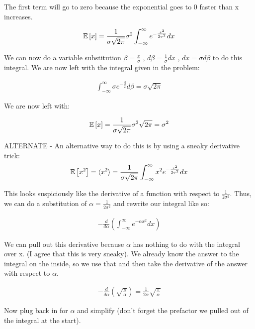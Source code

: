 \documentclass[11pt]{article}
\begin{document}
The first term will go to zero because the exponential goes to 0 faster than x increases.

\begin{eqnarray*}
\mathbb{E}\left[x\right] = \frac{1}{\sigma\sqrt{2\pi}} \sigma^2 \int_{-\infty}^{\infty} e^{-\frac{x^2}{2\sigma^2}} dx
\end{eqnarray*}

We can now do a variable substitution $\beta=\frac{x}{\sigma}$ , $d\beta=\frac{1}{\sigma}dx$ , $dx=\sigma d\beta$ to do this integral.  We are now left with the integral given in the problem:

\begin{eqnarray*}
\int_{-\infty}^{\infty} \sigma e^{-\frac{\beta}{2}} d\beta = \sigma \sqrt{2\pi}
\end{eqnarray*}

We are now left with:

\begin{eqnarray*}
\mathbb{E}\left[x\right] = \frac{1}{\sigma\sqrt{2\pi}} \sigma^3 \sqrt{2\pi} = \sigma^2
\end{eqnarray*}

ALTERNATE - An alternative way to do this is by using a sneaky derivative trick:
\begin{eqnarray*}
\mathbb{E}\left[x^2\right] = \langle x^2\rangle = \frac{1}{\sigma\sqrt{2\pi}} \int_{-\infty}^{\infty} x^2 e^{-\frac{x^2}{2\sigma^2}} dx 
\end{eqnarray*}

This looks suspiciously like the derivative of a function with respect to $\frac{1}{2\sigma^2}$.  Thus, we can do a substitution of $\alpha = \frac{1}{2\sigma^2}$ and rewrite our integral like so:

\begin{eqnarray*}
-\frac{d}{d\alpha} \left(\int_{-\infty}^{\infty} e^{-\alpha{x^2}} dx\right) 
\end{eqnarray*}

We can pull out this derivative because $\alpha$ has nothing to do with the integral over x.  (I agree that this is very sneaky).  We already know the answer to the integral on the inside, so we use that and then take the derivative of the answer with respect to $\alpha$.

\begin{eqnarray*}
-\frac{d}{d\alpha} \left(\sqrt{\frac{\pi}{\alpha}}\right) = \frac{1}{2\alpha}\sqrt{\frac{\pi}{\alpha}}
\end{eqnarray*}

Now plug back in for $\alpha$ and simplify (don't forget the prefactor we pulled out of the integral at the start).
\end{document}
